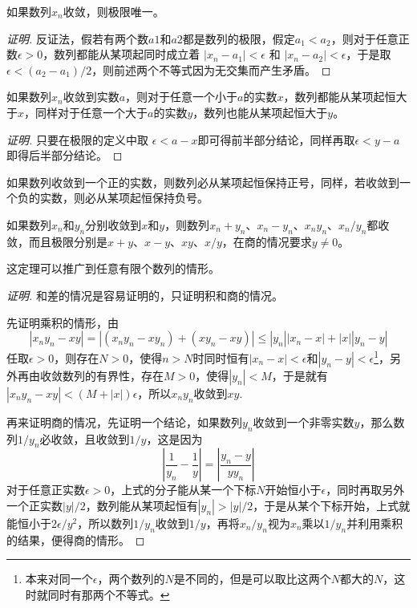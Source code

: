 \begin{theorem}[极限唯一性]
  如果数列$x_n$收敛，则极限唯一。
\end{theorem}

\begin{proof}[证明]
  反证法，假若有两个数$a1$和$a2$都是数列的极限，假定$a_1<a_2$，则对于任意正数$\epsilon > 0$，数列都能从某项起同时成立着 $|x_n-a_1| < \epsilon$ 和 $|x_n-a_2| < \epsilon$，于是取$\epsilon < (a_2-a_1)/2$，则前述两个不等式因为无交集而产生矛盾。
\end{proof}

\begin{theorem}
  如果数列$x_n$收敛到实数$a$，则对于任意一个小于$a$的实数$x$，数列都能从某项起恒大于$x$，同样对于任意一个大于$a$的实数$y$，数列也能从某项起恒大于$y$。
\end{theorem}

\begin{proof}[证明]
  只要在极限的定义中取 $\epsilon < a-x$即可得前半部分结论，同样再取$\epsilon < y-a$即得后半部分结论。
\end{proof}

\begin{inference}[极限的保号性]
  如果数列收敛到一个正的实数，则数列必从某项起恒保持正号，同样，若收敛到一个负的实数，则必从某项起恒保持负号。
\end{inference}


\begin{theorem}
  如果数列$x_n$和$y_n$分别收敛到$x$和$y$，则数列$x_n+y_n$、$x_n-y_n$、$x_ny_n$、$x_n/y_n$都收敛，而且极限分别是$x+y$、$x-y$、$xy$、$x/y$，在商的情况要求$y \neq 0$。
\end{theorem}

这定理可以推广到任意有限个数列的情形。

\begin{proof}[证明]
  和差的情况是容易证明的，只证明积和商的情况。

  先证明乘积的情形，由
  \begin{equation*}
    |x_ny_n-xy| = |(x_ny_n-xy_n) + (xy_n-xy)| \leqslant |y_n||x_n-x| + |x| |y_n-y|
  \end{equation*}
  任取$\epsilon > 0$，则存在$N>0$，使得$n>N$时同时恒有$|x_n-x|<\epsilon$和$|y_n-y|<\epsilon$\footnote{本来对同一个$\epsilon$，两个数列的$N$是不同的，但是可以取比这两个$N$都大的$N$，这时就同时有那两个不等式。}，另外再由收敛数列的有界性，存在$M>0$，使得$ |y_n| < M$，于是就有 $|x_ny_n-xy| < (M+|x|)\epsilon$，所以$x_ny_n$收敛到$xy.$

  再来证明商的情况，先证明一个结论，如果数列$y_n$收敛到一个非零实数$y$，那么数列$1/y_n$必收敛，且收敛到$1/y$，这是因为
  \begin{equation*}
    \left| \frac{1}{y_n} - \frac{1}{y} \right| = \left| \frac{y_n-y}{yy_n} \right|
  \end{equation*}
  对于任意正实数$\epsilon>0$，上式的分子能从某一个下标$N$开始恒小于$\epsilon$，同时再取另外一个正实数$|y|/2$，数列能从某项起恒有$|y_n|>|y|/2$，于是从某个下标开始，上式就能恒小于$2\epsilon / y^2$，所以数列$1/y_n$收敛到$1/y$，再将$x_n/y_n$视为$x_n$乘以$1/y_n$并利用乘积的结果，便得商的情形。
\end{proof}

